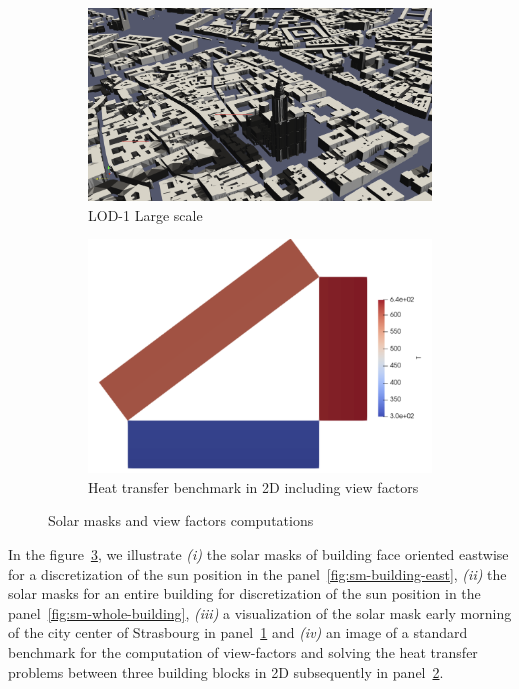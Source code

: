 \documentclass[runningheads]{llncs}
\begin{document}
\begin{figure}[htbp]
\begin{subfigure}{.4\textwidth}
  \includegraphics[width=\linewidth]{images/solar-masks-strasbourg.png}
  \caption{LOD-1 Large scale}
  \label{fig:sm-strasbourg}
\end{subfigure}
\begin{subfigure}{.4\textwidth}
  \centering
  \includegraphics[width=\linewidth]{images/view-factors-benchmark.png}
  \caption{Heat transfer benchmark in 2D including view factors}
  \label{fig:view-factor}
\end{subfigure}
\caption{Solar masks and view factors computations}
\label{fig:solar-masks-vf}
\end{figure}

In the figure~\ref{fig:solar-masks-vf}, we illustrate \textit{(i)} the solar masks of building face oriented eastwise for a discretization of the sun position in the panel~\ref{fig:sm-building-east}, \textit{(ii)} the solar masks for an entire building for discretization of the sun position in the panel~\ref{fig:sm-whole-building}, \textit{(iii)} a visualization of the solar mask early morning of the city center of Strasbourg in panel~\ref{fig:sm-strasbourg} and \textit{(iv)} an image of a standard benchmark for the computation of view-factors and solving the heat transfer problems between three building blocks in 2D subsequently in panel~\ref{fig:view-factor}.
\end{document}

